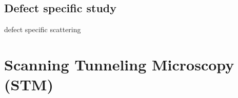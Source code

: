 \section{Defect specific study}
defect specific scattering 


\chapter{Scanning Tunneling Microscopy (STM)}












